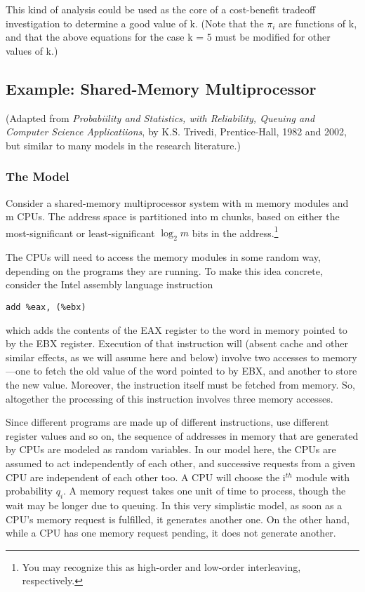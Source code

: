 
This kind of analysis could be used as the core of a cost-benefit
tradeoff investigation to determine a good value of k. (Note that the
$\pi_{i}$ are functions of k, and that the above equations for the case
k = 5 must be modified for other values of k.)

\subsection{Example:  Shared-Memory Multiprocessor}
\label{shmem}

(Adapted from \textit{Probabiility and Statistics, with Reliability, Queuing
and Computer Science Applicatiions}, by K.S. Trivedi, Prentice-Hall,
1982 and 2002, but similar to many models in the research literature.)

\subsubsection{The Model}

Consider a shared-memory multiprocessor system with m memory modules and
m CPUs.  The address space is partitioned into m chunks, based on either
the most-significant or least-significant $\log_2m$ bits in the
address.\footnote{You may recognize this as high-order and
low-order interleaving, respectively.} 

The CPUs will need to access the memory modules in some random way,
depending on the programs they are running.  To make this idea concrete,
consider the Intel assembly language instruction

\begin{verbatim}
add %eax, (%ebx)
\end{verbatim}

which adds the contents of the EAX register to the word in memory
pointed to by the EBX register.  Execution of that instruction will
(absent cache and other similar effects, as we will assume here and
below) involve two accesses to memory---one to fetch the old value of
the word pointed to by EBX, and another to store the new value.
Moreover, the instruction itself must be fetched from memory.  So,
altogether the processing of this instruction involves three memory
accesses.

Since different programs are made up of different instructions, use
different register values and so on, the sequence of addresses in memory
that are generated by CPUs are modeled as random variables.  In our
model here, the CPUs are assumed to act independently of each other, and
successive requests from a given CPU are independent of each other too.
A CPU will choose the i$^{th}$ module with probability $q_{i}$. A memory
request takes one unit of time to process, though the wait may be longer
due to queuing.  In this very simplistic model, as soon as a CPU's
memory request is fulfilled, it generates another one.  On the other
hand, while a CPU has one memory request pending, it does not generate
another.

